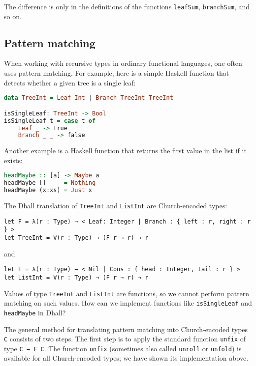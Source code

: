 The difference is only in the definitions of the functions \lstinline!leafSum!, \lstinline!branchSum!, and so on.


\subsection{Pattern matching}


When working with recursive types in ordinary functional languages, one often uses pattern matching.
For example, here is a simple Haskell function that detects whether a given tree is a single leaf:


\begin{lstlisting}[language=Haskell]
data TreeInt = Leaf Int | Branch TreeInt TreeInt

isSingleLeaf: TreeInt -> Bool
isSingleLeaf t = case t of
    Leaf _ -> true
    Branch _ _ -> false
\end{lstlisting}


Another example is a Haskell function that returns the first value in the list if it exists:


\begin{lstlisting}[language=Haskell]
headMaybe :: [a] -> Maybe a
headMaybe []     = Nothing
headMaybe (x:xs) = Just x
\end{lstlisting}


The Dhall translation of \lstinline!TreeInt! and \lstinline!ListInt! are Church-encoded types:


\begin{lstlisting}[language=Dhall]
let F = λ(r : Type) → < Leaf: Integer | Branch : { left : r, right : r } >
let TreeInt = ∀(r : Type) → (F r → r) → r
\end{lstlisting}


and


\begin{lstlisting}[language=Dhall]
let F = λ(r : Type) → < Nil | Cons : { head : Integer, tail : r } >
let ListInt = ∀(r : Type) → (F r → r) → r
\end{lstlisting}


Values of type \lstinline!TreeInt! and \lstinline!ListInt! are functions, so we cannot perform pattern matching on such values.
How can we implement functions like \lstinline!isSingleLeaf! and \lstinline!headMaybe! in Dhall?


The general method for translating pattern matching into Church-encoded types \lstinline!C! consists of two steps.
The first step is to apply the standard function \lstinline!unfix! of type \lstinline!C → F C!.
The function \lstinline!unfix! (sometimes also called \lstinline!unroll! or \lstinline!unfold!) is available for all Church-encoded types; we have shown its implementation above.


